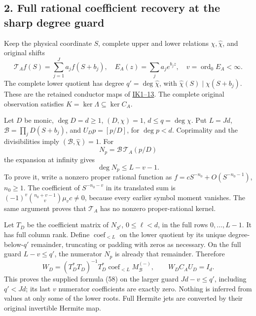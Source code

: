 \documentclass[11pt]{article}
\begin{document}
\subsection{2. Full rational coefficient recovery at the sharp degree guard}\label{full-rational-coefficient-recovery-at-the-sharp-degree-guard}

Keep the physical coordinate \(S\), complete upper and lower relations \(\chi,\widehat\chi\), and original shifts \[
\mathcal T_A f(S)=\sum_{j=1}^J a_j f(S+b_j),\quad
E_A(z)=\sum_j a_j e^{b_jz},\quad v=\operatorname{ord}_0E_A<\infty.
\] The complete lower quotient has degree \(q'=\deg\widehat\chi\), with \(\widehat\chi(S)\mid\chi(S+b_j)\). These are the retained conductor maps of \href{https://github.com/KokunoYumeto/zeta-function-research-reader/blob/689a8f87e9c12b7a99b01b3123438c6751ee608f/workbenches/splitzero-tandem/continuations/20260921-directional-inverse-power/007/INVERSE_POWER_CONDUCTOR_OBSERVABILITY.tex}{IK1--13}. The complete original observation satisfies \(K=\ker\Lambda\subseteq\ker C_A\).

Let \(D\) be monic, \(\deg D=d\ge1\), \((D,\chi)=1\), \(d\le q=\deg\chi\). Put \(L=Jd\), \(\mathcal B=\prod_jD(S+b_j)\), and \(U_Dp=[p/D]\), for \(\deg p<d\). Coprimality and the divisibilities imply \((\mathcal B,\widehat\chi)=1\). For \[
N_p=\mathcal B\,\mathcal T_A(p/D)
\] the expansion at infinity gives \[
\deg N_p\le L-v-1.                                               \tag{UFR9}
\] To prove it, write a nonzero proper rational function as \(f=cS^{-n_0}+O(S^{-n_0-1})\), \(n_0\ge1\). The coefficient of \(S^{-n_0-v}\) in its translated sum is \((-1)^v\binom{n_0+v-1}{v}\mu_vc\ne0\), because every earlier symbol moment vanishes. The same argument proves that \(\mathcal T_A\) has no nonzero proper-rational kernel.

Let \(T_D\) be the coefficient matrix of \(N_{S^\ell}\), \(0\le\ell<d\), in the full rows \(0,\ldots,L-1\). It has full column rank. Define \(\operatorname{coef}_{<L}\) on the lower quotient by its unique degree-below-\(q'\) remainder, truncating or padding with zeros as necessary. On the full guard \(L-v\le q'\), the numerator \(N_p\) is already that remainder. Therefore \[
W_D=(T_D^*T_D)^{-1}T_D^*
       \operatorname{coef}_{<L}M_{\mathcal B}^{(-)},\qquad
\boxed{W_DC_AU_D=I_d}.                                          \tag{UFR10}
\] This proves the supplied formula (58) on the larger guard \(Jd-v\le q'\), including \(q'<Jd\); its last \(v\) numerator coefficients are exactly zero. Nothing is inferred from values at only some of the lower roots. Full Hermite jets are converted by their original invertible Hermite map.
\end{document}
